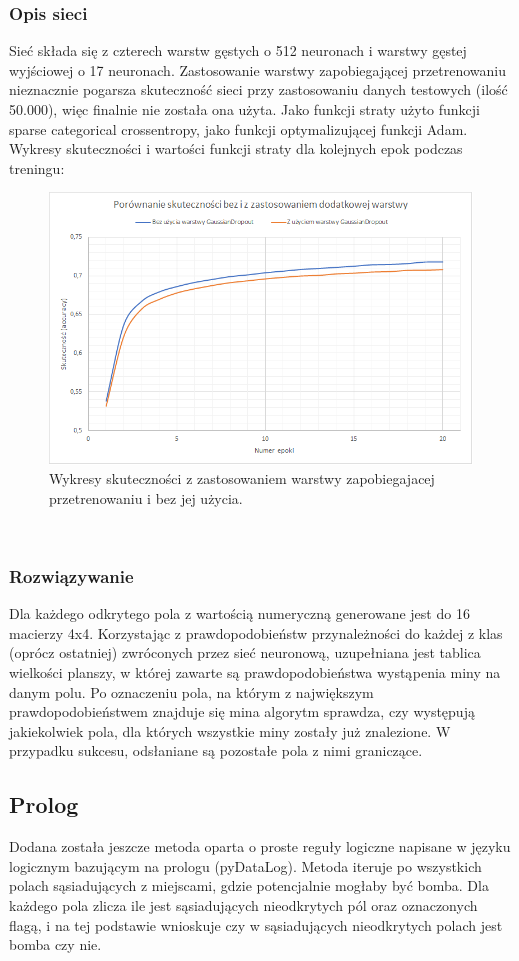 \documentclass[letterpaper,12pt]{article} %
\begin{document}
\subsubsection*{Opis sieci}
Sieć składa się z czterech warstw gęstych o 512 neuronach i warstwy gęstej wyjściowej o 17 neuronach. Zastosowanie warstwy zapobiegającej przetrenowaniu nieznacznie pogarsza skuteczność sieci przy zastosowaniu danych testowych (ilość 50.000), 
więc finalnie nie została ona użyta. 
Jako funkcji straty użyto funkcji sparse categorical crossentropy, jako funkcji optymalizującej funkcji Adam. Wykresy skuteczności i wartości funkcji straty dla kolejnych epok podczas treningu:
\begin{figure}[h]
    \centering
    \includegraphics[scale=0.85]{gaussian.png}
    \caption{Wykresy skuteczności z zastosowaniem warstwy zapobiegajacej przetrenowaniu i bez jej użycia.}
\end{figure} \\

\subsubsection*{Rozwiązywanie}
Dla każdego odkrytego pola z wartością numeryczną generowane jest do 16 macierzy 4x4. Korzystając z prawdopodobieństw przynależności do każdej z klas (oprócz ostatniej) zwróconych przez sieć neuronową, uzupełniana jest tablica wielkości planszy,
w której zawarte są prawdopodobieństwa wystąpenia miny na danym polu. Po oznaczeniu pola, na którym z największym prawdopodobieństwem znajduje się mina algorytm sprawdza, czy występują jakiekolwiek pola, dla których wszystkie miny zostały już znalezione. W przypadku sukcesu, 
odsłaniane są pozostałe pola z nimi graniczące.
\subsection{Prolog}
Dodana została jeszcze metoda oparta o proste reguły logiczne napisane w języku logicznym bazującym na prologu (pyDataLog).
Metoda iteruje po wszystkich polach sąsiadujących z miejscami, gdzie potencjalnie mogłaby być bomba.
Dla każdego pola zlicza ile jest sąsiadujących nieodkrytych pól oraz oznaczonych flagą, i na tej podstawie wnioskuje czy w sąsiadujących nieodkrytych polach jest bomba czy nie.
\end{document}
